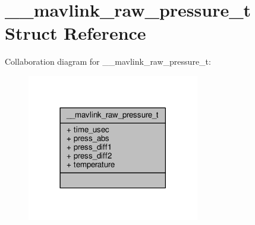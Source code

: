\hypertarget{struct____mavlink__raw__pressure__t}{\section{\+\_\+\+\_\+mavlink\+\_\+raw\+\_\+pressure\+\_\+t Struct Reference}
\label{struct____mavlink__raw__pressure__t}
}


Collaboration diagram for \+\_\+\+\_\+mavlink\+\_\+raw\+\_\+pressure\+\_\+t\+:
\nopagebreak
\begin{figure}[H]
\begin{center}
\leavevmode
\includegraphics[width=213pt]{struct____mavlink__raw__pressure__t__coll__graph}
\end{center}
\end{figure}
